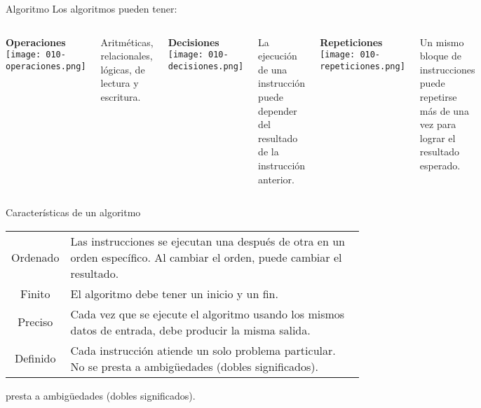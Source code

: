 \begin{frame}[c]{Algoritmo}
  Los algoritmos pueden tener:

  \begin{columns}[t]
      \begin{center}
        \textbf{Operaciones} \\
        \texttt{[image: 010-operaciones.png]}
      \end{center}
      Aritméticas, relacionales, lógicas, de lectura y escritura.

      \begin{center}
      \textbf{Decisiones} \\
        \texttt{[image: 010-decisiones.png]}
      \end{center}
      La ejecución de una instrucción puede depender del resultado de la
      instrucción anterior.

      \begin{center}
      \textbf{Repeticiones} \\
        \texttt{[image: 010-repeticiones.png]}
      \end{center}
      Un mismo bloque de instrucciones puede repetirse más de una vez para
      lograr el resultado esperado.
  \end{columns}
\end{frame}

\begin{frame}[c]{Características de un algoritmo}
  \begin{center}
    \begin{tabular}{c l}
      Ordenado & Las instrucciones se ejecutan una después de otra en un orden
      específico. Al cambiar el orden, puede cambiar el resultado. \\
      Finito & El algoritmo debe tener un inicio y un fin. \\
      Preciso & Cada vez que se ejecute el algoritmo usando los mismos datos
      de entrada, debe producir la misma salida. \\
      Definido & Cada instrucción atiende un solo problema particular. No se
      presta a ambigüedades (dobles significados).
    \end{tabular}

      presta a ambigüedades (dobles significados).


  \end{center}
\end{frame}


